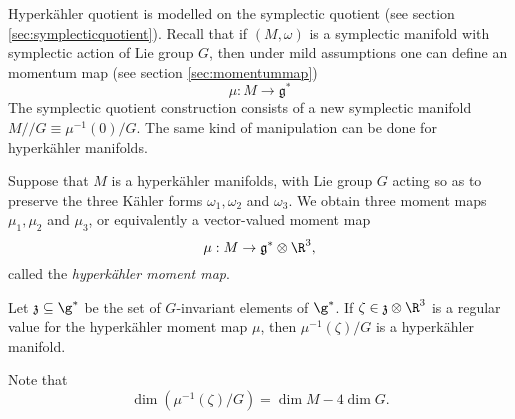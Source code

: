 \documentclass{worksheetclass}
\begin{document}
        Hyperkähler quotient is modelled on the symplectic quotient (see section \ref{sec:symplecticquotient}). Recall that if $(M,\omega)$ is a symplectic manifold with symplectic action of Lie group $G$, then under mild assumptions one can define an momentum map (see section \ref{sec:momentummap})
        \begin{equation}
            \mu:M\to\mathfrak{g}^*
        \end{equation}
        The symplectic quotient construction consists of a new symplectic manifold $M//G\equiv\mu^{-1}(0)/G$. The same kind of manipulation can be done for hyperkähler manifolds.

        Suppose that $M$ is a hyperkähler manifolds, with Lie group $G$ acting so as to preserve the three Kähler forms $\omega_1,\omega_2$ and $\omega_3$. We obtain three moment maps $\mu_1,\mu_2$ and $\mu_3$, or equivalently a vector-valued moment map
        \begin{equation}
            \mu:M\to\mathfrak{g^*}\otimes\R^3,
        \end{equation}
        called the \emph{hyperkähler moment map}.
        \begin{theorem}
            Let $\mathfrak{z}\subseteq\g^*$ be the set of $G$-invariant elements of $\g^*$. If $\zeta\in\mathfrak{z}\otimes\R^3$ is a regular value for the hyperkähler moment map $\mu$, then $\mu^{-1}(\zeta)/G$ is a hyperkähler manifold.
        \end{theorem}
        Note that
        \begin{equation}
            \dim(\mu^{-1}(\zeta)/G) = \dim M - 4\dim G.
        \end{equation}
\end{document}

